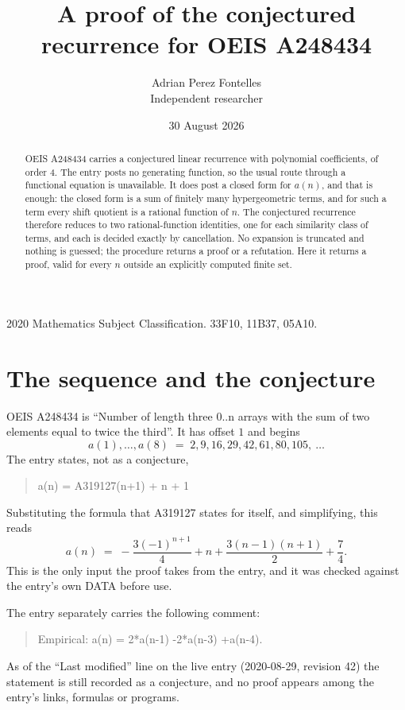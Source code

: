 \documentclass[11pt,a4paper]{article}
\title{A proof of the conjectured recurrence for OEIS A248434}
\author{Adrian Perez Fontelles\\ \small Independent researcher}
\date{30 August 2026}
\theoremstyle{plain}
\theoremstyle{definition}
\begin{document}
\maketitle

\begin{abstract}
OEIS A248434 carries a conjectured linear recurrence with polynomial coefficients, of
order 4. The entry posts no generating function, so the usual route through a
functional equation is unavailable. It does post a closed form for $a(n)$, and that is
enough: the closed form is a sum of finitely many hypergeometric terms, and for such a
term every shift quotient is a rational function of $n$. The conjectured recurrence
therefore reduces to two rational-function identities, one for each similarity
class of terms, and each is decided exactly by cancellation. No expansion is truncated and
nothing is guessed; the procedure returns a proof or a refutation. Here it returns a proof,
valid for every $n$ outside an explicitly computed finite set.
\end{abstract}

\noindent\small 2020 Mathematics Subject Classification. 33F10, 11B37, 05A10.\normalsize

\section{The sequence and the conjecture}

OEIS A248434 is ``Number of length three 0..n arrays with the sum of two elements equal to twice the third''. It has offset $1$ and begins
\[
a(1),\dots,a(8)\;=\;2, 9, 16, 29, 42, 61, 80, 105,\ \dots
\]
The entry states, not as a conjecture,
\begin{quote}\small
a(n) = A319127(n+1) + n + 1
\end{quote}
Substituting the formula that A319127 states for itself, and simplifying, this reads
\begin{equation}\label{eq:cf}
a(n)\;=\;- \frac{3 \left(-1\right)^{n + 1}}{4} + n + \frac{3 \left(n - 1\right) \left(n + 1\right)}{2} + \frac{7}{4} .
\end{equation}
This is the only input the proof takes from the entry, and it was checked against the
entry's own DATA before use.

The entry separately carries the following comment:
\begin{quote}\small
Empirical: a(n) = 2*a(n-1) -2*a(n-3) +a(n-4).
\end{quote}
As of the ``Last modified'' line on the live entry (2020-08-29, revision 42) the
statement is still recorded as a conjecture, and no proof appears among the entry's links,
formulas or programs.
\end{document}
